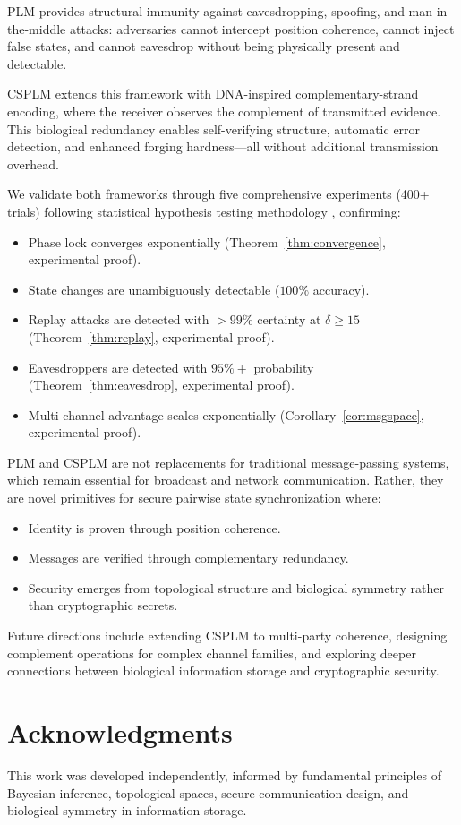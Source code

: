 \documentclass[twocolumn,10pt,a4paper]{article}
\theoremstyle{plain}
\theoremstyle{definition}
\begin{document}
PLM provides structural immunity against eavesdropping, spoofing, and man-in-the-middle attacks: adversaries cannot intercept position coherence, cannot inject false states, and cannot eavesdrop without being physically present and detectable.

CSPLM extends this framework with DNA-inspired complementary-strand encoding, where the receiver observes the complement of transmitted evidence. This biological redundancy enables self-verifying structure, automatic error detection, and enhanced forging hardness---all without additional transmission overhead.

We validate both frameworks through five comprehensive experiments (400+ trials) following statistical hypothesis testing methodology \cite{neyman1933problem,lehmann1997testing}, confirming:
\begin{itemize}
\item Phase lock converges exponentially (Theorem~\ref{thm:convergence}, experimental proof).
\item State changes are unambiguously detectable ($100\%$ accuracy).
\item Replay attacks are detected with $>99\%$ certainty at $\delta \geq 15$ (Theorem~\ref{thm:replay}, experimental proof).
\item Eavesdroppers are detected with $95\%+$ probability (Theorem~\ref{thm:eavesdrop}, experimental proof).
\item Multi-channel advantage scales exponentially (Corollary~\ref{cor:msgspace}, experimental proof).
\end{itemize}

PLM and CSPLM are not replacements for traditional message-passing systems, which remain essential for broadcast and network communication. Rather, they are novel primitives for secure pairwise state synchronization where:
\begin{itemize}
\item Identity is proven through position coherence.
\item Messages are verified through complementary redundancy.
\item Security emerges from topological structure and biological symmetry rather than cryptographic secrets.
\end{itemize}

Future directions include extending CSPLM to multi-party coherence, designing complement operations for complex channel families, and exploring deeper connections between biological information storage and cryptographic security.

\section*{Acknowledgments}

This work was developed independently, informed by fundamental principles of Bayesian inference, topological spaces, secure communication design, and biological symmetry in information storage.



\end{document}
